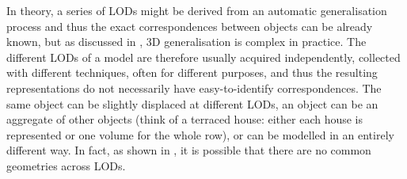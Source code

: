 In theory, a series of LODs might be derived from an automatic generalisation process \citep{Weibel97} and thus the exact correspondences between objects can be already known, but as discussed in , 3D generalisation is complex in practice.
The different LODs of a model are therefore usually acquired independently, collected with different techniques, often for different purposes, and thus the resulting representations do not necessarily have easy-to-identify correspondences.
The same object can be slightly displaced at different LODs, an object can be an aggregate of other objects (think of a terraced house: either each house is represented or one volume for the whole row), or can be modelled in an entirely different way.
In fact, as shown in , it is possible that there are no common geometries across LODs.

